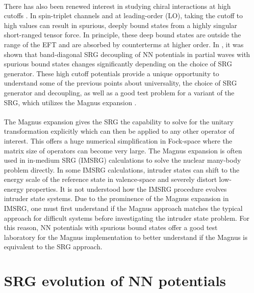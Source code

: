 \documentclass[preprintnumbers,floatfix,aps,prc,preprint,nofootinbib]{revtex4-1}
\begin{document}
\\
There has also been renewed interest in studying chiral interactions at high cutoffs \cite{Tews:2018sbi}. In spin-triplet channels and at leading-order (LO), taking the cutoff to high values can result in spurious, deeply bound states from a highly singular short-ranged tensor force. In principle, these deep bound states are outside the range of the EFT and are absorbed by counterterms at higher order. In \cite{Wendt:2011qj}, it was shown that band-diagonal SRG decoupling of NN potentials in partial waves with spurious bound states changes significantly depending on the choice of SRG generator. These high cutoff potentials provide a unique opportunity to understand some of the previous points about universality, the choice of SRG generator and decoupling, as well as a good test problem for a variant of the SRG, which utilizes the Magnus expansion \cite{Morris:2015yna}.
\\

\\
The Magnus expansion gives the SRG the capability to solve for the unitary transformation explicitly which can then be applied to any other operator of interest. This offers a huge numerical simplification in Fock-space where the matrix size of operators can become very large. The Magnus expansion is often used in in-medium SRG (IMSRG) calculations to solve the nuclear many-body problem directly. In some IMSRG calculations, intruder states can shift to the energy scale of the reference state in valence-space and severely distort low-energy properties. It is not understood how the IMSRG procedure evolves intruder state systems. Due to the prominence of the Magnus expansion in IMSRG, one must first understand if the Magnus approach matches the typical approach for difficult systems before investigating the intruder state problem. For this reason, NN potentials with spurious bound states offer a good test laboratory for the Magnus implementation to better understand if the Magnus is equivalent to the SRG approach.
\\



\section{SRG evolution of NN potentials}
\label{sec:srg_evolution_nn_potentials}
\end{document}
